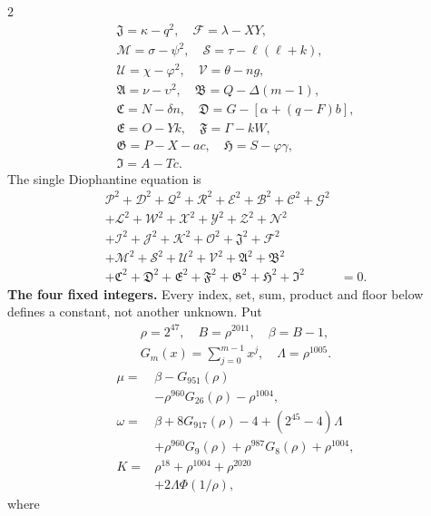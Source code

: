 \documentclass[10pt]{article}
\begin{document}
\begin{multicols}{2}
\[\begin{gathered}
\mathfrak{J}=\kappa-q^2,\quad\mathcal{F}=\lambda-XY,\\
\mathcal{M}=\sigma-\psi^2,\quad\mathcal{S}=\tau-\ell(\ell+k),\\
\mathcal{U}=\chi-\varphi^2,\quad\mathcal{V}=\theta-ng,\\
\mathfrak{A}=\nu-\upsilon^2,\quad\mathfrak{B}=Q-\Delta(m-1),\\
\mathfrak{C}=N-\delta n,\quad\mathfrak{D}=G-[\alpha+(q-F)b],\\
\mathfrak{E}=O-Yk,\quad\mathfrak{F}=\Gamma-kW,\\
\mathfrak{G}=P-X-ac,\quad\mathfrak{H}=S-\varphi\gamma,\\
\mathfrak{I}=A-Tc.
\end{gathered}
\]
The single Diophantine equation is
\[
\begin{split}
\mathcal{P}^2+\mathcal{D}^2+\mathcal{Q}^2+\mathcal{R}^2+\mathcal{E}^2+\mathcal{B}^2+\mathcal{C}^2+\mathcal{G}^2 &\\
+\mathcal{L}^2+\mathcal{W}^2+\mathcal{X}^2+\mathcal{Y}^2+\mathcal{Z}^2+\mathcal{N}^2 &\\
+\mathcal{I}^2+\mathcal{J}^2+\mathcal{K}^2+\mathcal{O}^2+\mathfrak{J}^2+\mathcal{F}^2 &\\
+\mathcal{M}^2+\mathcal{S}^2+\mathcal{U}^2+\mathcal{V}^2+\mathfrak{A}^2+\mathfrak{B}^2 &\\
+\mathfrak{C}^2+\mathfrak{D}^2+\mathfrak{E}^2+\mathfrak{F}^2+\mathfrak{G}^2+\mathfrak{H}^2+\mathfrak{I}^2 &= 0.
\end{split}
\]
\textbf{The four fixed integers.}
Every index, set, sum, product and floor below defines a constant, not
another unknown. Put
\[
\begin{gathered}
\rho=2^{47},\quad B=\rho^{2011},\quad\beta=B-1,\\
G_m(x)=\sum_{j=0}^{m-1}x^j,\quad
\Lambda=\rho^{1005}.
\end{gathered}
\]
\begin{align*}
\mu={}&\beta-G_{951}(\rho)\\
&-\rho^{960}G_{26}(\rho)-\rho^{1004},\\
\omega={}&\beta+8G_{917}(\rho)-4+(2^{45}-4)\Lambda\\
&+\rho^{960}G_9(\rho)+\rho^{987}G_8(\rho)
  +\rho^{1004},\\
K={}&\rho^{18}+\rho^{1004}+\rho^{2020}\\
&+2\Lambda\Phi(1/\rho),
\end{align*}
where
\[
\begin{gathered}

\end{gathered}\]
\end{multicols}
\end{document}

